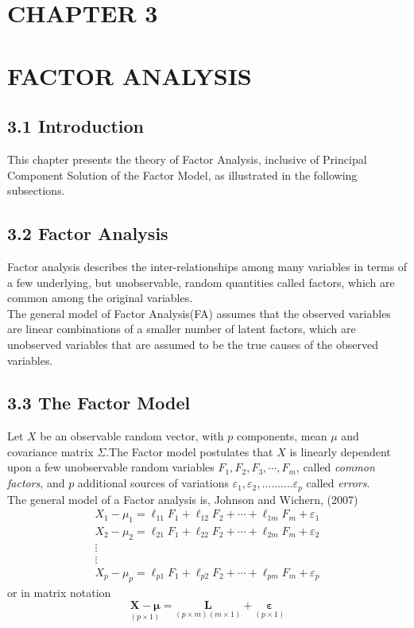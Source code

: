 \documentclass[12pt]{article}
\numberwithin{equation}{section}
\begin{document}
\section*{CHAPTER 3}
\section*{FACTOR ANALYSIS}
\subsection*{3.1 Introduction}
This chapter presents the theory of Factor Analysis, inclusive of Principal Component Solution of the Factor Model, as illustrated in the following subsections.

\subsection*{3.2 Factor Analysis}
Factor analysis describes the inter-relationships among many variables in terms of a few underlying, but unobservable, random quantities called factors, which are common among the original variables.\\

\noindent The general model of Factor Analysis(FA) assumes that the observed variables are linear combinations of a smaller number of latent factors, which are unobserved variables that are assumed to be the true causes of the observed variables.\\


\subsection*{3.3 The Factor Model}
Let $X$ be an observable random vector, with $p$ components, mean $\mu$ and covariance matrix $\Sigma$.The Factor model postulates that $X$ is linearly dependent upon a few unobservable random variables $F_1, F_2, F_3, \cdots, F_m$, called \emph{common factors}, and $p$ additional sources of variations $\varepsilon_1, \varepsilon_2, ..........\varepsilon_p$ called \emph{errors}.\\
\noindent The general model of a Factor analysis is, Johnson and Wichern, (2007)
\begin{equation}
	\begin{gathered}
		X_1-\mu_1=\ell_{11}F_1+\ell_{12}F_2+\cdots+\ell_{1 m} F_m+\varepsilon_1 \\
		X_2-\mu_2=\ell_{21} F_1+\ell_{22} F_2+\cdots+\ell_{2 m}F_m+\varepsilon_2 \\
		\vdots \\
		\vdots \\
		X_p-\mu_p=\ell_{p 1}F_1+\ell_{p 2} F_2+\cdots+\ell_{p m}F_m+\varepsilon_p
	\end{gathered}
\end{equation}
or in matrix notation
\begin{equation}
\underset{(p \times 1)}{\mathbf{X}-\boldsymbol{\mu}}=\underset{(p \times m)(m \times 1)}{\mathbf{L}}+\underset{(p \times 1)}{\boldsymbol{\varepsilon}}
\end{equation}
\end{document}
